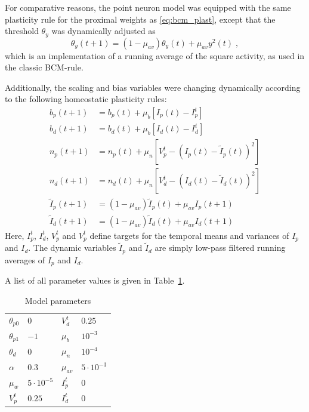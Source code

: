 \documentclass[10pt,a4paper,twocolumn]{article}
\begin{document}
		For comparative reasons, the point neuron model was equipped with the
		same plasticity rule for the proximal weights as \eqref{eq:bcm_plast}, 
		except that the threshold $\theta_y$ was dynamically adjusted as
		\begin{equation}
			\theta_y(t+1) = \left(1-\mu_{av}\right)\theta_y(t) + \mu_{av} y^2(t) \; , 
		\end{equation}
		which is an implementation of a running average of the square activity,
		as used in the classic BCM-rule.
		
		Additionally, the scaling and bias variables were changing dynamically
		according to the following homeostatic plasticity rules:
		\begin{align}
			b_p(t+1) &= b_p(t) + \mu_b \left[I_p(t) - I_p^t\right] \\
			b_d(t+1) &= b_d(t) + \mu_b \left[I_d(t) - I_d^t\right] \\
			n_p(t+1) &= n_p(t) + \mu_n \left[V_p^t - \left( I_p(t) - \tilde{I}_p(t)\right)^2\right] \\
			n_d(t+1) &= n_d(t) + \mu_n \left[V_d^t - \left( I_d(t) - \tilde{I}_d(t)\right)^2\right] \\
			\tilde{I}_p(t+1) &= (1-\mu_{av})\tilde{I}_p(t) + \mu_{av} I_p(t+1) \\
			\tilde{I}_d(t+1) &= (1-\mu_{av})\tilde{I}_d(t) + \mu_{av} I_d(t+1)
		\end{align}
		Here, $I_p^t$, $I_d^t$, $V_p^t$ and $V_p^t$ define targets for the 
		temporal means and variances of $I_p$ and $I_d$. The dynamic variables 
		$\tilde{I}_p$ and $\tilde{I}_d$ are simply low-pass filtered running 
		averages of $I_p$ and $I_d$.
		
		A list of all parameter values is given in Table~\ref{tab:parameters}.
		
		\begin{table}
			\begin{tabular}{ l | l || l | l }
				$\theta_{p0}$ & $0$ & $V_d^t$ & $0.25$ \\
				$\theta_{p1}$ & $-1$ & $\mu_b$ & $10^{-3}$ \\ 
				$\theta_{d}$ & $0$ & $\mu_n$ & $10^{-4}$ \\  
				$\alpha$ & $0.3$ & $\mu_{av}$ & $5 \cdot 10^{-3}$ \\   
				$\mu_w$ & $5 \cdot 10^{-5}$ & $I_p^t$ & $0$ \\
				$V_p^t$ & $0.25$ & $I_d^t$ & $0$  
			\end{tabular}
		\caption{Model parameters}
		\label{tab:parameters}
		\end{table}
		
\end{document}
